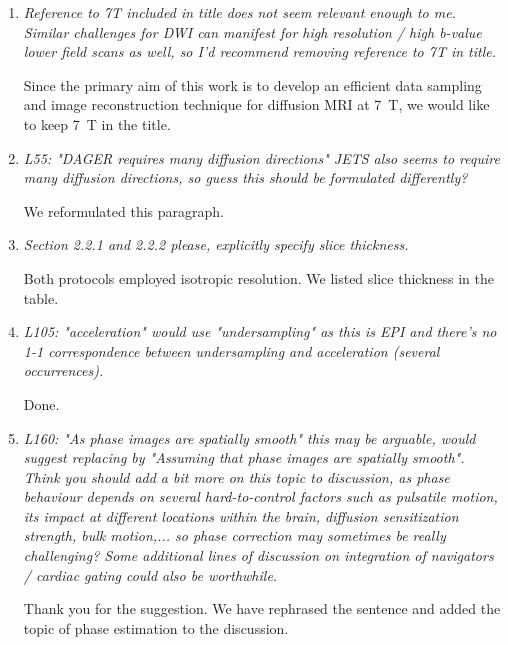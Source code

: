 \documentclass[a4paper,11pt,twoside]{report}
\begin{document}
\begin{enumerate}[resume]
    \item \textit{Reference to 7T included in title does not seem relevant enough to me. Similar challenges for DWI can manifest for high resolution / high b-value lower field scans as well, so I'd recommend removing reference to 7T in title.}

    \hspace{1em} Since the primary aim of this work is
    to develop an efficient data sampling and image reconstruction technique
    for diffusion MRI at \SI{7}{\tesla}, we would like to keep \SI{7}{\tesla} in the title.

    \item \textit{L55: "DAGER requires many diffusion directions" \textrightarrow JETS also seems to require many diffusion directions, so guess this should be formulated differently?}

    \hspace{1em} We reformulated this paragraph.

    \item \textit{Section 2.2.1 and 2.2.2 \textrightarrow please, explicitly specify slice thickness.}

    \hspace{1em} Both protocols employed isotropic resolution.
    We listed slice thickness in the table.

    \item \textit{L105: "acceleration" \textrightarrow would use "undersampling" as this is EPI and there's no 1-1 correspondence between undersampling and acceleration (several occurrences).}

    \hspace{1em} Done.

    \item \textit{L160: "As phase images are spatially smooth" \textrightarrow this may be arguable, would suggest replacing by "Assuming that phase images are spatially smooth". Think you should add a bit more on this topic to discussion, as phase behaviour depends on several hard-to-control factors such as pulsatile motion, its impact at different locations within the brain, diffusion sensitization strength, bulk motion,... so phase correction may sometimes be really challenging? Some additional lines of discussion on integration of navigators / cardiac gating could also be worthwhile.}

    \hspace{1em} Thank you for the suggestion.
    We have rephrased the sentence and added the topic of phase estimation to the discussion.


\end{enumerate}
\end{document}
